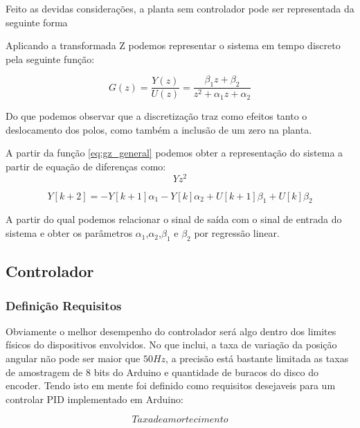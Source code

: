 \documentclass[a4paper,11pt]{article}
\begin{document}
Feito as devidas considerações, a planta sem controlador pode ser representada da seguinte forma


Aplicando a transformada Z podemos representar o sistema em tempo discreto pela seguinte função:

\begin{equation}\label{eq:gz_general}
    G(z) = \frac{Y(z)}{U(z)} = \frac{\beta_1 z + \beta_2}{z^2 + \alpha_1 z + \alpha_2}
\end{equation}

Do que podemos observar que a discretização traz como efeitos tanto o deslocamento dos polos, como também a inclusão de um zero na planta.

A partir da função \ref{eq:gz_general} podemos obter a representação do sistema a partir de equação de diferenças como:
$$
Y z^2
$$

\begin{equation}\label{eq:gz_general}
  Y[k+2] = -Y[k+1]\alpha_1 - Y[k]\alpha_2 + U[k+1]\beta_1 + U[k]\beta_2
\end{equation}

A partir do qual podemos relacionar o sinal de saída com o sinal de entrada do sistema e obter os parâmetros $\alpha_1$,$\alpha_2$,$\beta_1$ e $\beta_2$ por regressão linear.


\subsection{Controlador}

\subsubsection{Definição Requisitos}

Obviamente o melhor desempenho do controlador será algo dentro dos limites físicos do dispositivos envolvidos. No que inclui, a taxa de variação da posição angular não pode ser maior que $50Hz$, a precisão está bastante limitada as taxas de amostragem de 8 bits do Arduino e quantidade de buracos do disco do encoder. Tendo isto em mente foi definido como requisitos desejaveis para um controlar PID implementado em Arduino:

$$ Taxa de amortecimento
$$
\end{document}
